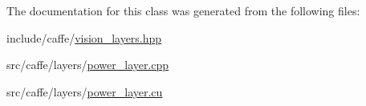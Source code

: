 The documentation for this class was generated from the following files\+:\begin{DoxyCompactItemize}
\item 
include/caffe/\hyperlink{vision__layers_8hpp}{vision\+\_\+layers.\+hpp}\item 
src/caffe/layers/\hyperlink{power__layer_8cpp}{power\+\_\+layer.\+cpp}\item 
src/caffe/layers/\hyperlink{power__layer_8cu}{power\+\_\+layer.\+cu}\end{DoxyCompactItemize}
